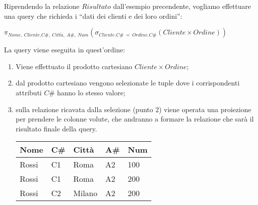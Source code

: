 \begin{exmp}
 Riprendendo la relazione $Risultato$ dall'esempio precendente, vogliamo effettuare
 una query che richieda i ``dati dei clienti e dei loro ordini'':
 \begin{center}
  \begin{math}
   \pi_{Nome,\ Cliente.C\#,\ Citt\grave{a},\ A\#,\ Num} 
   (\sigma_{Cliente.C\#\ =\ Ordine.C\#}(
   Cliente \times Ordine))
  \end{math}
 \end{center}
 La query viene eseguita in quest'ordine:
 \begin{enumerate}
  \item Viene effettuato il prodotto cartesiano $Cliente \times Ordine$;
  \item dal prodotto cartesiano vengono selezionate le tuple dove i corrispondenti
  attributi $C\#$ hanno lo stesso valore;
  \item sulla relazione ricavata dalla selezione (punto 2) viene operata una proiezione
  per prendere le colonne volute, che andranno a formare la relazione che
  sarà il risultato finale della query.
\begin{center}
 \begin{tabular}{l|l|l|l|l}
  Nome & C\# & Città  & A\# & Num\\
  \hline
  Rossi & C1 & Roma  & A2 & 100\\
  Rossi & C1 & Roma  & A2 & 200\\
  Rossi & C2 & Milano & A2 & 200\\
 \end{tabular}

\end{center}
 \end{enumerate}

\end{exmp}

